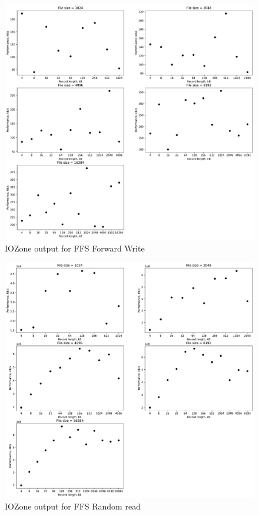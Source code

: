\begin{figure}[!htb]
	\label{fig:app_bench_ffs_rnd_read}
	\begin{center}
		\includegraphics[width=1.0\textwidth]{figures/benchmarking/ffs/Writer.pdf}
	\end{center}
	\caption{IOZone output for FFS Forward Write}
\end{figure}

\begin{figure}[!htb]
	\label{fig:app_bench_ffs_rnd_read}
	\begin{center}
		\includegraphics[width=1.0\textwidth]{figures/benchmarking/ffs/Random read.pdf}
	\end{center}
	\caption{IOZone output for FFS Random read}
\end{figure}

